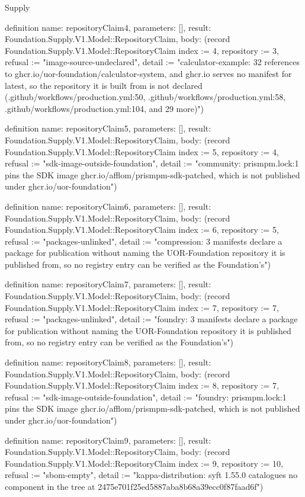 \begin{lexlean}{Supply}
\begin{semanticmodule}
definition{
  name: repositoryClaim4,
  parameters: [],
  result: Foundation.Supply.V1.Model::RepositoryClaim,
  body: (record Foundation.Supply.V1.Model::RepositoryClaim {index := 4, repository := 3, refusal := "image-source-undeclared", detail := "calculator-example: 32 references to ghcr.io/uor-foundation/calculator-system, and ghcr.io serves no manifest for latest, so the repository it is built from is not declared (.github/workflows/production.yml:50, .github/workflows/production.yml:58, .github/workflows/production.yml:104, and 29 more)"})
}

definition{
  name: repositoryClaim5,
  parameters: [],
  result: Foundation.Supply.V1.Model::RepositoryClaim,
  body: (record Foundation.Supply.V1.Model::RepositoryClaim {index := 5, repository := 4, refusal := "sdk-image-outside-foundation", detail := "community: prismpm.lock:1 pins the SDK image ghcr.io/afflom/prismpm-sdk-patched, which is not published under ghcr.io/uor-foundation"})
}

definition{
  name: repositoryClaim6,
  parameters: [],
  result: Foundation.Supply.V1.Model::RepositoryClaim,
  body: (record Foundation.Supply.V1.Model::RepositoryClaim {index := 6, repository := 5, refusal := "packages-unlinked", detail := "compression: 3 manifests declare a package for publication without naming the UOR-Foundation repository it is published from, so no registry entry can be verified as the Foundation's"})
}

definition{
  name: repositoryClaim7,
  parameters: [],
  result: Foundation.Supply.V1.Model::RepositoryClaim,
  body: (record Foundation.Supply.V1.Model::RepositoryClaim {index := 7, repository := 7, refusal := "packages-unlinked", detail := "foundry: 3 manifests declare a package for publication without naming the UOR-Foundation repository it is published from, so no registry entry can be verified as the Foundation's"})
}

definition{
  name: repositoryClaim8,
  parameters: [],
  result: Foundation.Supply.V1.Model::RepositoryClaim,
  body: (record Foundation.Supply.V1.Model::RepositoryClaim {index := 8, repository := 7, refusal := "sdk-image-outside-foundation", detail := "foundry: prismpm.lock:1 pins the SDK image ghcr.io/afflom/prismpm-sdk-patched, which is not published under ghcr.io/uor-foundation"})
}

definition{
  name: repositoryClaim9,
  parameters: [],
  result: Foundation.Supply.V1.Model::RepositoryClaim,
  body: (record Foundation.Supply.V1.Model::RepositoryClaim {index := 9, repository := 10, refusal := "sbom-empty", detail := "kappa-distribution: syft 1.55.0 catalogues no component in the tree at 2475e701f25ed5887aba8b68a39ecc0f87faad6f"})
}


\end{semanticmodule}
\end{lexlean}
